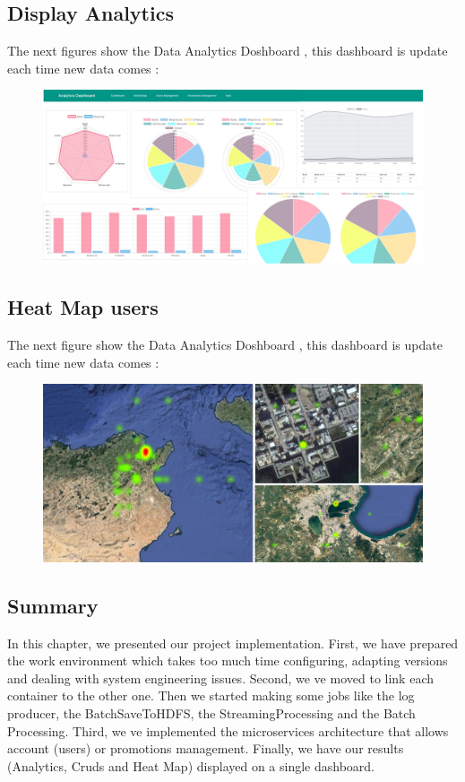 \subsection{Display Analytics}
\label{sec:sec01}
The next figures show the Data Analytics Doshboard , this dashboard is update each time new data comes :
\begin{figure}[h!]
	\centering
	\includegraphics[height=0.3\textheight]{fig01/Dashboard}
	\label{fig:FilialesEtClients}
\end{figure}
\subsection{Heat Map users}
\label{sec:sec01}
The next figure show the Data Analytics Doshboard , this dashboard is update each time new data comes :
\begin{figure}[h!]
	\centering
	\includegraphics[height=0.3\textheight]{fig01/HeatMap}
	\label{fig:FilialesEtClients}
\end{figure}
\subsection{Summary}
\label{sec:sec01}
In this chapter, we presented our project implementation. 
First, we have prepared the work environment which takes too much time configuring, adapting versions and dealing
 with system engineering issues. 
 Second, we ve moved to link each container to the other one. 
 Then we started making some jobs like the log producer, the BatchSaveToHDFS, the StreamingProcessing and the 
 Batch Processing. 
 Third, we ve implemented the microservices architecture that allows account (users) or promotions management.
  Finally, we have our results (Analytics, Cruds and Heat Map) displayed on a single dashboard.
\newpage
